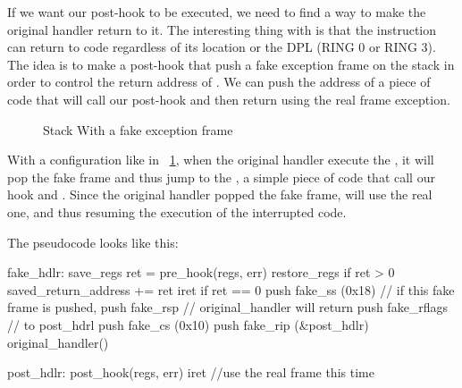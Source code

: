 If we want our post-hook to be executed, we need to find a way to make the
original handler return to it. The interesting thing with  is that
the instruction can return to code regardless of its location or the DPL
(RING 0 or RING 3).
The idea is to make a post-hook that push a fake exception frame on the stack
in order to control the return address of .
We can push the address of a piece of code that will call our post-hook and
then return using the real frame exception.

\begin{figure}[h]
  \begin{drawstack}[scale=.75]
    \startframe
     
     
     
     
     
    \startframe
     
     
     
     
     \esp
  \end{drawstack}
  \caption{Stack With a fake exception frame}
  \label{fake_int_frame}
\end{figure}

With a configuration like in ~\ref{fake_int_frame}, when the original handler
execute the , it will pop the fake frame and thus jump to the
, a simple piece of code that call our hook and .
Since the original handler popped the fake frame,  will use
the real one, and thus resuming the execution of the interrupted code.

The pseudocode looks like this:\\
\begin{pseudocode}
fake_hdlr:
  save_regs
  ret = pre_hook(regs, err)
  restore_regs
  if ret > 0
      saved_return_address += ret
      iret
  if ret == 0
      push fake_ss (0x18)         // if this fake frame is pushed,
      push fake_rsp               // original_handler will return
      push fake_rflags            // to post_hdrl
      push fake_cs (0x10)
      push fake_rip (&post_hdlr)
  original_handler()

post_hdlr:
  post_hook(regs, err)
  iret                           //use the real frame this time
\end{pseudocode}

